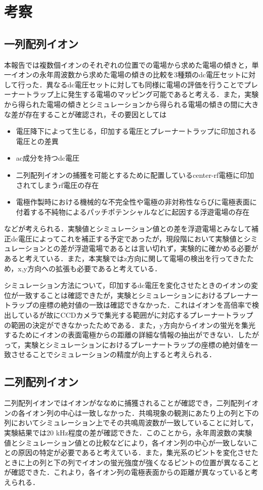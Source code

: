 \chapter{考察}
\section{一列配列イオン}
本報告では複数個イオンのそれぞれの位置での電場から求めた電場の傾きと，単一イオンの永年周波数から求めた電場の傾きの比較を3種類のdc電圧セットに対して行った．異なるdc電圧セットに対しても同様に電場の評価を行うことでプレーナートラップ上に発生する電場のマッピング可能であると考える．また，実験から得られた電場の傾きとシミュレーションから得られる電場の傾きの間に大きな差が存在することが確認され，その要因としては
\begin{itemize}
	\item 電圧降下によって生じる，印加する電圧とプレーナートラップに印加される電圧との差異
	\item ac成分を持つdc電圧
	\item 二列配列イオンの捕獲を可能とするために配置しているcenter-rf電極に印加されてしまうrf電圧の存在
	\item 電極作製時における機械的な不完全性や電極の非対称性ならびに電極表面に付着する不純物によるパッチポテンシャルなどに起因する浮遊電場の存在
\end{itemize}
などが考えられる．実験値とシミュレーション値との差を浮遊電場とみなして補正dc電圧によってこれを補正する予定であったが，現段階において実験値とシミュレーションとの差が浮遊電場であるとは言い切れず，実験的に確かめる必要があると考えている．また，本実験ではz方向に関して電場の検出を行ってきたため，x,y方向への拡張も必要であると考えている．
	
シミュレーション方法について，印加するdc電圧を変化させたときのイオンの変位が一致することは確認できたが，実験とシミュレーションにおけるプレーナートラップの座標の絶対値の一致は確認できなかった．これはイオンを高倍率で検出しているが故にCCDカメラで集光する範囲がに対応するプレーナートラップの範囲の決定ができなかったためである．また，y方向からイオンの蛍光を集光するためにイオンの表面電極からの距離の詳細な情報の抽出ができない．したがって，実験とシミュレーションにおけるプレーナートラップの座標の絶対値を一致させることでシミュレーションの精度が向上すると考えられる．

\section{二列配列イオン}
二列配列イオンではイオンがななめに捕獲されることが確認でき，二列配列イオンの各イオン列の中心は一致しなかった．共鳴現象の観測にあたり上の列と下の列においてシミュレーション上でその共鳴周波数が一致していることに対して，実験結果では20 kHz程度の差が確認できた．このことから，永年周波数の実験値とシミュレーション値との比較などにより，各イオン列の中心が一致しないことの原因の特定が必要であると考えている．また，集光系のピントを変化させたときに上の列と下の列でイオンの蛍光強度が強くなるピントの位置が異なることが確認できた．これより，各イオン列の電極表面からの距離が異なっていると考えられる．